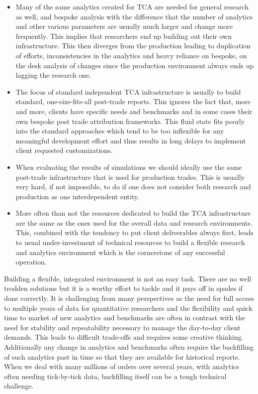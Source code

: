 \begin{itemize}
\item Many of the same analytics created for TCA are needed for general research as well, and bespoke analysis with the difference that the number of analytics and other various parameters are usually much larger and change more frequently. This implies that researchers end up building out their own infrastructure. This then diverges from the production leading to duplication of efforts, inconsistencies in the analytics and heavy reliance on bespoke, on the desk analysis of changes since the production environment always ends up lagging the research one.

\item The focus of standard independent TCA infrastructure is usually to build standard, one-size-fits-all post-trade reports. This ignores the fact that, more and more, clients have specific needs and benchmarks and in some cases their own bespoke post trade attribution frameworks. This fluid state fits poorly into the standard approaches which tend to be too inflexible for any meaningful development effort and thus results in long delays to implement client requested customizations.

\item When evaluating the results of simulations we should ideally use the same post-trade infrastructure that is used for production trades. This is usually very hard, if not impossible, to do if one does not consider both research and production as one interdependent entity.

\item More often than not the resources dedicated to build the TCA infrastructure are the same as the ones used for the overall data and research environments. This, combined with the tendency to put client deliverables always first, leads to usual under-investment of technical resources to build a flexible research and analytics environment which is the cornerstone of any successful operation.
\end{itemize}


Building a flexible, integrated environment is not an easy task. There are no well trodden solutions but it is a worthy effort to tackle and it pays off in spades if done correctly. It is challenging from many perspectives as the need for full access to multiple years of data  for quantitative researchers and the flexibility and quick time to market of new analytics and benchmarks are often in contrast with the need for stability and repeatability necessary to manage the day-to-day client demands. This leads to difficult trade-offs and requires some creative thinking. Additionally any change in analytics and benchmarks often require the backfilling of such analytics past in time so that they are available for historical reports. When we deal with many millions of orders over several years, with analytics often needing tick-by-tick data, backfilling itself can be a tough technical challenge.


